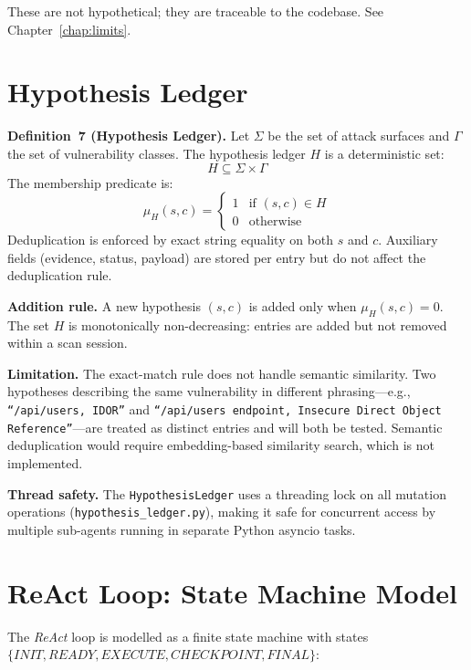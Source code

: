 \documentclass[12pt, a4paper, oneside, openany]{book}
\newcommand{\code}[1]{\texttt{#1}}
\newcommand{\file}[1]{\texttt{#1}}
\begin{document}
These are not hypothetical; they are traceable to the codebase.
See Chapter~\ref{chap:limits}.

\section{Hypothesis Ledger}
\label{sec:formal_ledger}

\begin{infobox}
\textbf{Definition~7 (Hypothesis Ledger).}\label{def:ledger}
Let $\Sigma$ be the set of attack surfaces and $\Gamma$ the set of
vulnerability classes.  The hypothesis ledger $H$ is a deterministic
set:
\[
  H \subseteq \Sigma \times \Gamma
\]
The membership predicate is:
\[
  \mu_H(s, c) =
  \begin{cases}
    1 & \text{if } (s, c) \in H \\
    0 & \text{otherwise}
  \end{cases}
\]
Deduplication is enforced by exact string equality on both $s$ and $c$.
Auxiliary fields (evidence, status, payload) are stored per entry but
do not affect the deduplication rule.
\end{infobox}

\textbf{Addition rule.}  A new hypothesis $(s, c)$ is added only
when $\mu_H(s, c) = 0$.  The set $H$ is monotonically non-decreasing:
entries are added but not removed within a scan session.

\textbf{Limitation.}  The exact-match rule does not handle semantic
similarity.  Two hypotheses describing the same vulnerability in
different phrasing---e.g., \texttt{``/api/users, IDOR''} and
\texttt{``/api/users endpoint, Insecure Direct Object Reference''}---are
treated as distinct entries and will both be tested.
Semantic deduplication would require embedding-based similarity
search, which is not implemented.

\textbf{Thread safety.}  The \code{HypothesisLedger} uses a threading
lock on all mutation operations (\file{hypothesis\_ledger.py}),
making it safe for concurrent access by multiple sub-agents running
in separate Python asyncio tasks.

\section{ReAct Loop: State Machine Model}
\label{sec:formal_react}

The \textit{ReAct} loop is modelled as
a finite state machine with states $\{INIT, READY, EXECUTE, CHECKPOINT, FINAL\}$:
\end{document}
